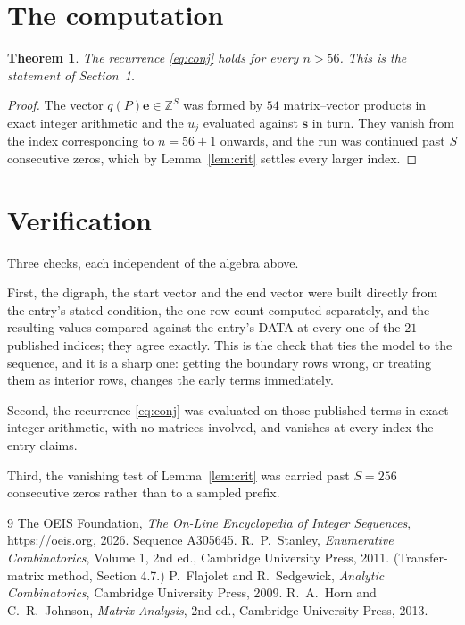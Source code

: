 \documentclass[11pt,a4paper]{article}
\theoremstyle{plain}
\newtheorem{theorem}{Theorem}
\theoremstyle{definition}
\begin{document}
\section{The computation}

\begin{theorem}
The recurrence \eqref{eq:conj} holds for every $n>56$. This is the statement of
Section~1.
\end{theorem}

\begin{proof}
The vector $q(P)\mathbf{e}\in\mathbb{Z}^{S}$ was formed by $54$ matrix--vector
products in exact integer arithmetic and the $u_j$ evaluated against $\mathbf{s}$ in turn.
They vanish from the index corresponding to $n=56+1$ onwards, and the run was continued
past $S$ consecutive zeros, which by Lemma~\ref{lem:crit} settles every larger index.
\end{proof}

\section{Verification}

Three checks, each independent of the algebra above.

First, the digraph, the start vector and the end vector were built directly from the
entry's stated condition, the one-row count computed separately, and the resulting values
compared against the entry's DATA at every one of the $21$ published indices; they
agree exactly. This is the check that ties the model to the sequence, and it is a sharp one:
getting the boundary rows wrong, or treating them as interior rows, changes the early terms
immediately.

Second, the recurrence \eqref{eq:conj} was evaluated on those published terms in exact
integer arithmetic, with no matrices involved, and vanishes at every index the entry claims.

Third, the vanishing test of Lemma~\ref{lem:crit} was carried past $S=256$ consecutive
zeros rather than to a sampled prefix.

\begin{thebibliography}{9}
 The OEIS Foundation, \emph{The On-Line Encyclopedia of Integer
Sequences}, \url{https://oeis.org}, 2026. Sequence A305645.
 R.~P.~Stanley, \emph{Enumerative Combinatorics}, Volume 1, 2nd ed.,
Cambridge University Press, 2011. (Transfer-matrix method, Section 4.7.)
 P.~Flajolet and R.~Sedgewick, \emph{Analytic Combinatorics}, Cambridge
University Press, 2009.
 R.~A.~Horn and C.~R.~Johnson, \emph{Matrix Analysis}, 2nd ed., Cambridge
University Press, 2013.
\end{thebibliography}
\end{document}
